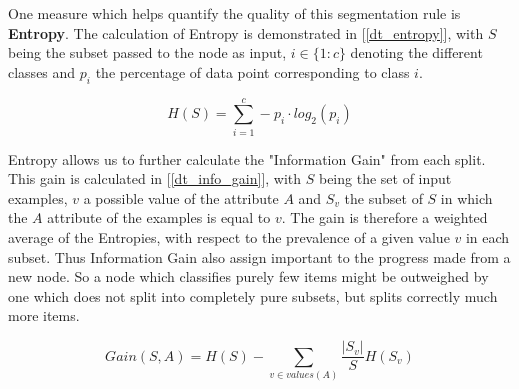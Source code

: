 			\par
			One measure which helps quantify the quality of this segmentation rule is \textbf{Entropy}. The calculation of Entropy is demonstrated in [\ref{dt_entropy}], with $ S $ being the subset passed to the node as input, $ i \in \{1:c \} $ denoting the different classes and $ p_i $ the percentage of data point corresponding to class $ i $. 
			
			\begin{equation}
				H(S) = \sum_{i=1}^c - p_i \cdot log_2 (p_i)
				\label{dt_entropy}
			\end{equation}
			
			 Entropy allows us to further calculate the "Information Gain" from each split. This gain is calculated in [\ref{dt_info_gain}], with $ S $ being the set of input examples, $ v $ a possible value of the attribute $ A $ and $ S_v $ the subset of $ S $ in which the $ A $ attribute of the examples is equal to $ v $. The gain is therefore a weighted average of the Entropies, with respect to the prevalence of a given value $ v $ in each subset. Thus Information Gain also assign important to the progress made from a new node. So a node which classifies purely few items might be outweighed by one which does not split into completely pure subsets, but splits correctly much more items.
			 
 			\begin{equation}
				Gain(S,A) = H(S) - \sum_{v \in values(A) } \frac{|S_v|}{S} H(S_v)
				\label{dt_info_gain}
			 \end{equation}
			
		 
		\cite{breiman1984classification}
		
